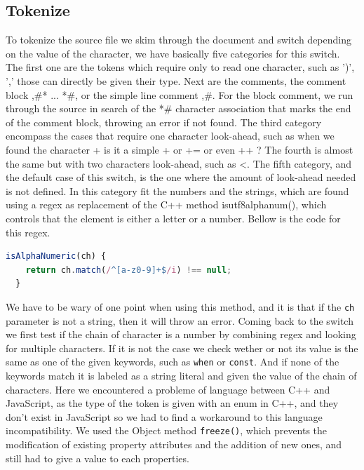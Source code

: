\documentclass{scrbook}
\begin{document}
\subsection{Tokenize}

To tokenize the source file we skim through the document and switch depending on the value of the character, we have basically five categories for this switch.
The first one are the tokens which require only to read one character, such as ')', ',' those can directly be given their type. Next are the comments, the comment block ,\#* ... *\#, or the simple line comment ,\#. For the block comment,
we run through the source in search of the *\# character association that marks the end of the comment block, throwing an error if not found. The third category encompass the cases that require one character look-ahead, such as when we found
the character + is it a simple + or += or even ++ ? The fourth is almost the same but with two characters look-ahead, such as <. The fifth category, and the default case of this switch, is the one where the amount of look-ahead needed is not defined.
In this category fit the numbers and the strings, which are found using a regex as replacement of the C++ method is\textunderscore utf8\textunderscore alpha\textunderscore num(), which controls that the element is either a letter or a number. Bellow is 
the code for this regex.
\begin{lstlisting}[language=JavaScript, basicstyle=\ttfamily\small]
  isAlphaNumeric(ch) {
    return ch.match(/^[a-z0-9]+$/i) !== null;
  }
\end{lstlisting}  
We have to be wary of one point when using this method, and it is that if the \texttt{ch} parameter is not a string, then it will throw an error. Coming back to the switch we first test if the chain of character is a number by combining regex and looking for multiple characters.
If it is not the case we check wether or not its value is the same as one of the given keywords, such as \texttt{when} or \texttt{const}. And if none of the keywords match it is labeled as a string literal and given the value of the chain of characters. Here we encountered a probleme 
of language between C++ and JavaScript, as the type of the token is given with an enum in C++, and they don't exist in JavaScript so we had to find a workaround to this language incompatibility. We used the Object method \texttt{freeze()}, which prevents the modification of existing property attributes and the addition of new ones, 
and still had to give a value to each properties.
\end{document}
